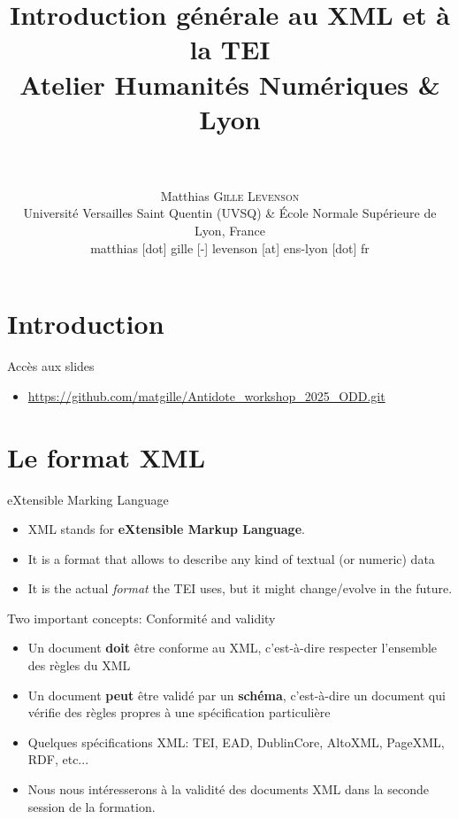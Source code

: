 \documentclass[11pt,aspectratio=1610]{beamer}
\date[]{}
\author[Matthias \textsc{Gille Levenson}]{\\~\\ Matthias \textsc{Gille Levenson}\\   {\scriptsize Université Versailles Saint Quentin (UVSQ) \& École Normale Supérieure de Lyon, France}\\ {\tiny matthias [dot] gille [-] levenson [at] ens-lyon [dot] fr}\vspace{-1cm}}
\title[TEI schemata]{Introduction générale au XML et à la TEI\\ {\small Atelier Humanités Numériques \& Lyon}}
\begin{document}
\maketitle

\section{Introduction}


\begin{frame}{Accès aux slides}
\begin{itemize}
\item \href{https://github.com/matgille/Antidote_workshop_2025_ODD.git}{https://github.com/matgille/Antidote\_workshop\_2025\_ODD.git}
\end{itemize}
\end{frame}

\section{Le format XML}


\begin{frame}{eXtensible Marking Language}
\begin{itemize}
\item XML stands for \textbf{eXtensible Markup Language}.
\item It is a format that allows to describe any kind of textual (or numeric) data 
\item It is the actual \textit{format} the TEI uses, but it might change/evolve in the future.
\end{itemize}
\end{frame}

\begin{frame}{Two important concepts: Conformité and validity}
\begin{itemize}
\item Un document \textbf{doit} être conforme au XML, c'est-à-dire respecter l'ensemble des règles du XML
\item Un document \textbf{peut} être validé par un \textbf{schéma}, c'est-à-dire un document qui vérifie des règles propres à une spécification particulière
\item Quelques spécifications XML: TEI, EAD, DublinCore, AltoXML, PageXML, RDF, etc...
\item Nous nous intéresserons à la validité des documents XML dans la seconde session de la formation.
\end{itemize}
\end{frame}
\end{document}
